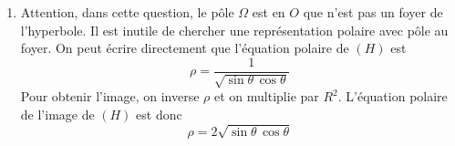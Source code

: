 \begin{enumerate}
\item Attention, dans cette question, le pôle $\Omega$ est en $O$ que n'est pas un foyer de l'hyperbole. Il est inutile de chercher une représentation polaire avec pôle au foyer. On peut écrire directement que l'équation polaire de $(H)$ est
\begin{displaymath}
 \rho = \dfrac{1}{\sqrt{\sin\theta \,\cos\theta}}
\end{displaymath}
Pour obtenir l'image, on inverse $\rho$ et on multiplie par $R^2$. L'équation polaire de l'image de $(H)$ est donc
\begin{displaymath}
 \rho = 2\sqrt{\sin\theta \,\cos\theta}
\end{displaymath}

\end{enumerate}
